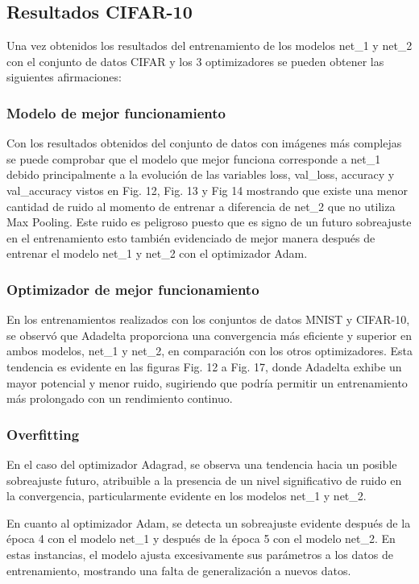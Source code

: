 \documentclass[journal]{IEEEtai}
\begin{document}
\subsection{Resultados CIFAR-10}

Una vez obtenidos los resultados del entrenamiento de los modelos net\_1 y net\_2 con el conjunto de datos CIFAR y los 3 optimizadores se pueden obtener las siguientes afirmaciones:
\hfill\break
\subsubsection{\textbf{Modelo de mejor funcionamiento}}

Con los resultados obtenidos del conjunto de datos con imágenes más complejas se puede comprobar que el modelo que mejor funciona corresponde a net\_1 debido principalmente a la evolución de las variables loss, val\_loss, accuracy y val\_accuracy  vistos en Fig. 12, Fig. 13 y Fig 14 mostrando que existe una menor cantidad de ruido al momento de entrenar a diferencia de net\_2 que no utiliza Max Pooling. Este ruido es peligroso puesto que es signo de un futuro sobreajuste en el entrenamiento esto también evidenciado de mejor manera después de entrenar el modelo net\_1 y net\_2 con el optimizador Adam.

\subsubsection{\textbf{Optimizador de mejor funcionamiento}}

En los entrenamientos realizados con los conjuntos de datos MNIST y CIFAR-10, se observó que Adadelta proporciona una convergencia más eficiente y superior en ambos modelos, net\_1 y net\_2, en comparación con los otros optimizadores. Esta tendencia es evidente en las figuras Fig. 12 a Fig. 17, donde Adadelta exhibe un mayor potencial y menor ruido, sugiriendo que podría permitir un entrenamiento más prolongado con un rendimiento continuo.

\subsubsection{\textbf{Overfitting}}
En el caso del optimizador Adagrad, se observa una tendencia hacia un posible sobreajuste futuro, atribuible a la presencia de un nivel significativo de ruido en la convergencia, particularmente evidente en los modelos net\_1 y net\_2.

En cuanto al optimizador Adam, se detecta un sobreajuste evidente después de la época 4 con el modelo net\_1 y después de la época 5 con el modelo net\_2. En estas instancias, el modelo ajusta excesivamente sus parámetros a los datos de entrenamiento, mostrando una falta de generalización a nuevos datos.
\end{document}
